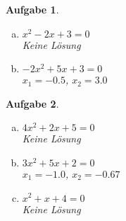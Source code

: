 \documentclass[12pt]{article}
\theoremstyle{note}
\newtheorem{aufgabe}{Aufgabe}
\begin{document}
\begin{flushleft}
\begin{aufgabe}
\begin{multicols}{3}
\begin{enumerate}[a)]
\item $x^{2} - 2 x + 3 = 0$\\
{\tiny Keine Lösung}

\item $- 2 x^{2} + 5 x + 3 = 0$\\
{\tiny $x_1=$$-0.5$}{\tiny   ,     $x_2=$$3.0$}

\end{enumerate} 
\end{multicols} 
\end{aufgabe}\vspace{1em}\begin{aufgabe} ~ \ 
\begin{multicols}{3} 
\begin{enumerate}[a)] 
\item $4 x^{2} + 2 x + 5 = 0$\\
{\tiny Keine Lösung}

\item $3 x^{2} + 5 x + 2 = 0$\\
{\tiny $x_1=$$-1.0$}{\tiny   ,     $x_2=$$-0.67$}

\item $x^{2} + x + 4 = 0$\\
{\tiny Keine Lösung}

\end{enumerate} 
\end{multicols} 
\end{aufgabe}\vspace{1em}
\end{flushleft} 
\end{document}
